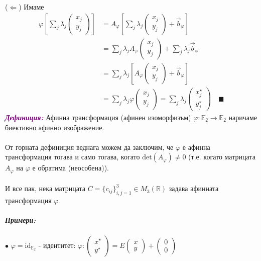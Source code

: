 \documentclass[12pt]{article}
\begin{document}
($\Leftarrow$) Имаме \begin{align*}\varphi\left[\sum_j \lambda_j \begin{pmatrix}x_j \\ y_j\end{pmatrix}\right] &= A_\varphi \left[\sum_j \lambda_j \begin{pmatrix}x_j \\ y_j\end{pmatrix}+\vec{b}_{\varphi}\right]\\ & = \sum_j \lambda_j A_\varphi \begin{pmatrix}x_j \\ y_j\end{pmatrix}+ \sum_j \lambda_j \vec{b}_\varphi\\ &= \sum_j \lambda_j \left[A_\varphi\begin{pmatrix}x_j \\ y_j\end{pmatrix}+\vec{b}_\varphi\right]\\ &= \sum_j\lambda_j\varphi \begin{pmatrix}x_j \\ y_j\end{pmatrix}= \sum_j\lambda_j\begin{pmatrix}x_j^\star \\ y_j^\star \end{pmatrix}\quad \blacksquare\end{align*}
\textbf{\textit{\textcolor{purple}{Дефиниция:}}} Афинна трансформация (афинен изоморфизъм) $\varphi:\mathbb{E}_2\to\mathbb{E}_2$ наричаме биективно афинно изображение.
\\
\\
От горната дефиниция веднага можем да заключим, че $\varphi$ е афинна трансформация тогава и само тогава, когато $\mathrm{det}(A_\varphi)\neq 0$ (т.е. когато матрицата $A_\varphi$ на $\varphi$ е обратима (неособена)).
\\
\\
И все пак, нека матрицата $C=\{c_{ij}\}_{i,j=1}^3\in M_3(\mathbb{R})$ задава афинната трансформация $\varphi$
\\
\\
\textbf{\textit{Примери:}}
\\
\\
$\bullet$ $\varphi=\mathrm{id}_{\mathbb E_2}$ - идентитет: $\varphi:\begin{pmatrix} x^\star \\ y^{\star}\end{pmatrix}=E\begin{pmatrix} x \\ y\end{pmatrix}+\begin{pmatrix} 0 \\ 0\end{pmatrix}$
\end{document}

